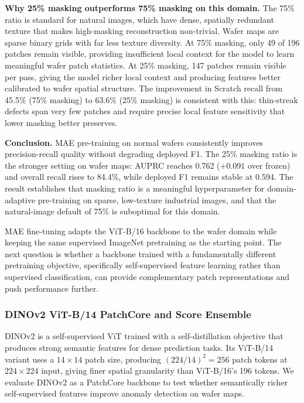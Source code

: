 \documentclass[11pt]{article}
\begin{document}
\textbf{Why 25\% masking outperforms 75\% masking on this domain.} The 75\% ratio is standard for natural images, which have dense, spatially redundant texture that makes high-masking reconstruction non-trivial. Wafer maps are sparse binary grids with far less texture diversity. At 75\% masking, only 49 of 196 patches remain visible, providing insufficient local context for the model to learn meaningful wafer patch statistics. At 25\% masking, 147 patches remain visible per pass, giving the model richer local context and producing features better calibrated to wafer spatial structure. The improvement in Scratch recall from 45.5\% (75\% masking) to 63.6\% (25\% masking) is consistent with this: thin-streak defects span very few patches and require precise local feature sensitivity that lower masking better preserves.

\textbf{Conclusion.} MAE pre-training on normal wafers consistently improves precision-recall quality without degrading deployed F1. The 25\% masking ratio is the stronger setting on wafer maps: AUPRC reaches 0.762 ($+0.091$ over frozen) and overall recall rises to 84.4\%, while deployed F1 remains stable at 0.594. The result establishes that masking ratio is a meaningful hyperparameter for domain-adaptive pre-training on sparse, low-texture industrial images, and that the natural-image default of 75\% is suboptimal for this domain.

MAE fine-tuning adapts the ViT-B/16 backbone to the wafer domain while keeping the same supervised ImageNet pretraining as the starting point. The next question is whether a backbone trained with a fundamentally different pretraining objective, specifically self-supervised feature learning rather than supervised classification, can provide complementary patch representations and push performance further.

\subsubsection{DINOv2 ViT-B/14 PatchCore and Score Ensemble}

DINOv2 \cite{oquab2023dinov2} is a self-supervised ViT trained with a self-distillation objective that produces strong semantic features for dense prediction tasks. Its ViT-B/14 variant uses a $14\!\times\!14$ patch size, producing $(224/14)^2 = 256$ patch tokens at $224\!\times\!224$ input, giving finer spatial granularity than ViT-B/16's 196 tokens. We evaluate DINOv2 as a PatchCore backbone to test whether semantically richer self-supervised features improve anomaly detection on wafer maps.
\end{document}
